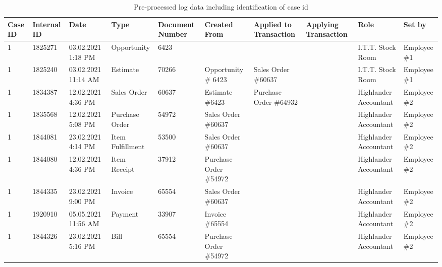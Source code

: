 \begin{table}[htb]
\scriptsize %
\begin{tabularx}{\textwidth}{|X|X|X|X|X|X|X|X|X|X|}
\hline
Case ID &Internal ID & Date & Type & Document Number & Created From & Applied to Transaction & Applying Transaction & Role & Set by\\
\hline
1 &1825271 & 03.02.2021 1:18 PM & Opportunity & 6423 &   &  &   & I.T.T. Stock Room & Employee \#1\\
\hline
1 &1825240 & 03.02.2021 11:14 AM & Estimate & 70266 & Opportunity \# 6423 & Sales Order \#60637  &   & I.T.T. Stock Room & Employee \#1\\
\hline
1 & 1834387 & 12.02.2021 4:36 PM & Sales Order & 60637 &	Estimate \#6423 &	Purchase Order \#64932 &	& Highlander Accountant &	Employee \#2 \\
\hline
1&1835568 & 12.02.2021 5:08 PM & Purchase Order & 54972 &	Sales Order \#60637
 &	 &	& Highlander Accountant &	Employee \#2 \\
\hline
1&1844081 & 23.02.2021 4:14 PM & Item Fulfillment & 53500 &	Sales Order \#60637
 &	 &	& Highlander Accountant &	Employee \#2 \\
\hline
1&1844080 & 12.02.2021 4:36 PM & Item Receipt & 37912 &	Purchase Order \#54972 &	 &	& Highlander Accountant &	Employee \#2 \\
\hline
1&1844335 & 23.02.2021 9:00 PM & Invoice & 65554 &	Sales Order \#60637
 &	 &	& Highlander Accountant &	Employee \#2 \\
\hline
1&1920910 & 05.05.2021 11:56 AM & Payment & 33907 &	Invoice \#65554
 &	 &	& Highlander Accountant &	Employee \#2 \\
\hline
1&1844326 & 23.02.2021 5:16 PM & Bill & 65554 &	Purchase Order \#54972
 &	 &	& Highlander Accountant &	Employee \#2 \\
\hline
\end{tabularx}
\caption{Pre-processed log data including identification of case id}
\label{table:datapreprocessed-case1}
\end{table}


